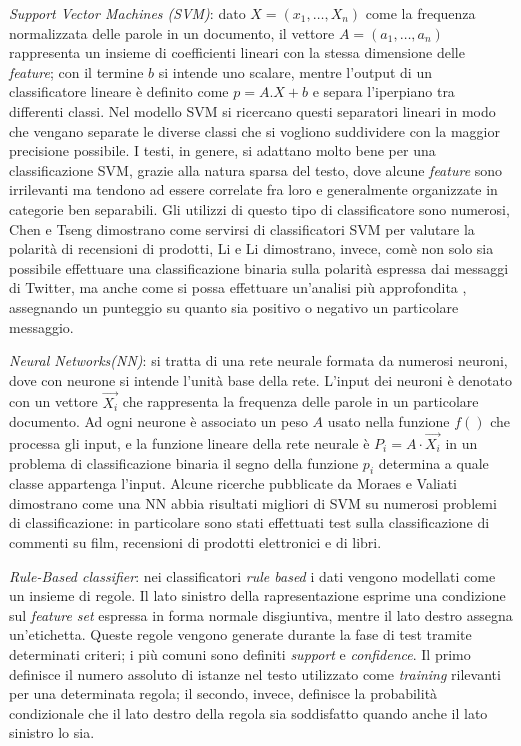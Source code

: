 \documentclass[a4paper,12pt,openright,twoside]{report}
\theoremstyle{definition}
\begin{document}
\emph{Support Vector Machines (SVM)}: dato $X=(x_1,\dots, X_n)$ come la frequenza normalizzata delle parole
in un documento, il vettore $A=(a_1,\dots,a_n)$ rappresenta un insieme di coefficienti lineari con la
stessa dimensione delle \emph{feature}; con il termine $b$ si intende uno scalare, 
mentre l'output di un classificatore
lineare è definito come $p=A.X + b$ e separa l'iperpiano tra differenti classi.
Nel modello SVM si ricercano questi separatori lineari in modo che vengano separate le diverse classi che si
vogliono suddividere con la maggior precisione possibile.
I testi, in genere, si adattano molto bene per una classificazione SVM, grazie alla natura sparsa del testo, dove
alcune \emph{feature} sono irrilevanti ma tendono ad essere correlate fra loro e generalmente organizzate
in categorie ben separabili.
Gli utilizzi di questo tipo di classificatore sono numerosi, Chen e Tseng %
dimostrano come servirsi di classificatori SVM per valutare la polarità di recensioni di prodotti,
Li e Li %
dimostrano, invece, comè non solo sia possibile effettuare una classificazione binaria sulla polarità espressa
dai messaggi di Twitter, ma anche come si possa effettuare un'analisi più approfondita
, assegnando un punteggio
su quanto sia positivo o negativo un particolare messaggio.

\emph{Neural Networks(NN)}: si tratta di una rete neurale formata da numerosi neuroni, dove con neurone si intende l'unità
base della rete. L'input dei neuroni è denotato con un vettore $\vec{X_i}$ che rappresenta la frequenza
delle parole in un particolare documento. Ad ogni neurone è associato un peso $A$ usato nella funzione $f()$
che processa gli input, e la funzione lineare della rete neurale è $P_i = A\cdot \vec{X_i}$ in un problema
di classificazione binaria il segno della funzione $p_i$ determina a quale classe appartenga l'input.
Alcune ricerche pubblicate da Moraes e Valiati %
dimostrano come una NN abbia risultati migliori di SVM su numerosi problemi di classificazione: in particolare
sono stati effettuati test sulla classificazione di commenti su film, recensioni di prodotti elettronici e di libri.

\emph{Rule-Based classifier}: nei classificatori \emph{rule based} i dati vengono modellati come un insieme di regole.
Il lato sinistro della rapresentazione esprime una condizione sul \emph{feature set} espressa in forma normale
disgiuntiva, mentre il lato destro assegna un'etichetta.
Queste regole vengono generate durante la fase di test tramite determinati criteri; i più comuni sono
definiti \emph{support} e \emph{confidence}. Il primo definisce il numero assoluto di 
istanze nel testo utilizzato
come \emph{training} rilevanti per una determinata regola; il secondo, invece, definisce la probabilità
condizionale che il lato destro della regola sia soddisfatto quando anche il lato sinistro lo sia.
\end{document}
